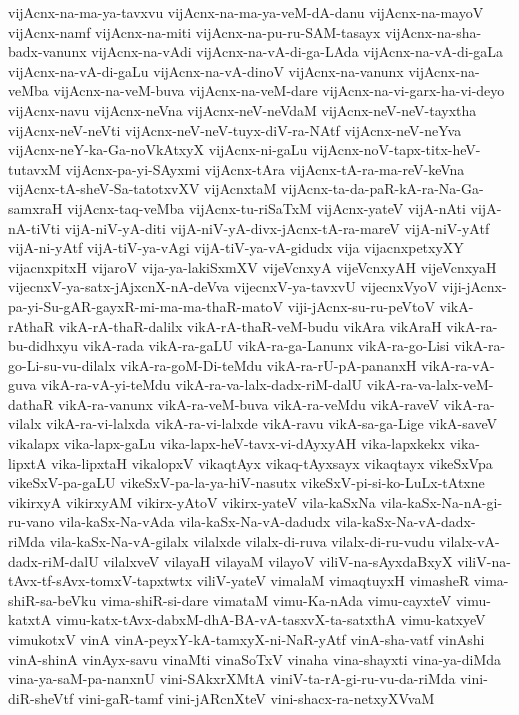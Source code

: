 {vijAcnx-na-ma-ya-tavxvu
vijAcnx-na-ma-ya-veM-dA-danu
vijAcnx-na-mayoV
vijAcnx-namf
vijAcnx-na-miti
vijAcnx-na-pu-ru-SAM-tasayx
vijAcnx-na-sha-badx-vanunx
vijAcnx-na-vAdi
vijAcnx-na-vA-di-ga-LAda
vijAcnx-na-vA-di-gaLa
vijAcnx-na-vA-di-gaLu
vijAcnx-na-vA-dinoV
vijAcnx-na-vanunx
vijAcnx-na-veMba
vijAcnx-na-veM-buva
vijAcnx-na-veM-dare
vijAcnx-na-vi-garx-ha-vi-deyo
vijAcnx-navu
vijAcnx-neVna
vijAcnx-neV-neVdaM
vijAcnx-neV-neV-tayxtha
vijAcnx-neV-neVti
vijAcnx-neV-neV-tuyx-diV-ra-NAtf
vijAcnx-neV-neYva
vijAcnx-neY-ka-Ga-noVkAtxyX
vijAcnx-ni-gaLu
vijAcnx-noV-tapx-titx-heV-tutavxM
vijAcnx-pa-yi-SAyxmi
vijAcnx-tAra
vijAcnx-tA-ra-ma-reV-keVna
vijAcnx-tA-sheV-Sa-tatotxvXV
vijAcnxtaM
vijAcnx-ta-da-paR-kA-ra-Na-Ga-samxraH
vijAcnx-taq-veMba
vijAcnx-tu-riSaTxM
vijAcnx-yateV
vijA-nAti
vijA-nA-tiVti
vijA-niV-yA-diti
vijA-niV-yA-divx-jAcnx-tA-ra-mareV
vijA-niV-yAtf
vijA-ni-yAtf
vijA-tiV-ya-vAgi
vijA-tiV-ya-vA-gidudx
vija
vijacnxpetxyXY
vijacnxpitxH
vijaroV
vija-ya-lakiSxmXV
vijeVcnxyA
vijeVcnxyAH
vijeVcnxyaH
vijecnxV-ya-satx-jAjxcnX-nA-deVva
vijecnxV-ya-tavxvU
vijecnxVyoV
viji-jAcnx-pa-yi-Su-gAR-gayxR-mi-ma-ma-thaR-matoV
viji-jAcnx-su-ru-peVtoV
vikA-rAthaR
vikA-rA-thaR-dalilx
vikA-rA-thaR-veM-budu
vikAra
vikAraH
vikA-ra-bu-didhxyu
vikA-rada
vikA-ra-gaLU
vikA-ra-ga-Lanunx
vikA-ra-go-Lisi
vikA-ra-go-Li-su-vu-dilalx
vikA-ra-goM-Di-teMdu
vikA-ra-rU-pA-pananxH
vikA-ra-vA-guva
vikA-ra-vA-yi-teMdu
vikA-ra-va-lalx-dadx-riM-dalU
vikA-ra-va-lalx-veM-dathaR
vikA-ra-vanunx
vikA-ra-veM-buva
vikA-ra-veMdu
vikA-raveV
vikA-ra-vilalx
vikA-ra-vi-lalxda
vikA-ra-vi-lalxde
vikA-ravu
vikA-sa-ga-Lige
vikA-saveV
vikalapx
vika-lapx-gaLu
vika-lapx-heV-tavx-vi-dAyxyAH
vika-lapxkekx
vika-lipxtA
vika-lipxtaH
vikalopxV
vikaqtAyx
vikaq-tAyxsayx
vikaqtayx
vikeSxVpa
vikeSxV-pa-gaLU
vikeSxV-pa-la-ya-hiV-nasutx
vikeSxV-pi-si-ko-LuLx-tAtxne
vikirxyA
vikirxyAM
vikirx-yAtoV
vikirx-yateV
vila-kaSxNa
vila-kaSx-Na-nA-gi-ru-vano
vila-kaSx-Na-vAda
vila-kaSx-Na-vA-dadudx
vila-kaSx-Na-vA-dadx-riMda
vila-kaSx-Na-vA-gilalx
vilalxde
vilalx-di-ruva
vilalx-di-ru-vudu
vilalx-vA-dadx-riM-dalU
vilalxveV
vilayaH
vilayaM
vilayoV
viliV-na-sAyxdaBxyX
viliV-na-tAvx-tf-sAvx-tomxV-tapxtwtx
viliV-yateV
vimalaM
vimaqtuyxH
vimasheR
vima-shiR-sa-beVku
vima-shiR-si-dare
vimataM
vimu-Ka-nAda
vimu-cayxteV
vimu-katxtA
vimu-katx-tAvx-dabxM-dhA-BA-vA-tasxvX-ta-satxthA
vimu-katxyeV
vimukotxV
vinA
vinA-peyxY-kA-tamxyX-ni-NaR-yAtf
vinA-sha-vatf
vinAshi
vinA-shinA
vinAyx-savu
vinaMti
vinaSoTxV
vinaha
vina-shayxti
vina-ya-diMda
vina-ya-saM-pa-nanxnU
vini-SAkxrXMtA
viniV-ta-rA-gi-ru-vu-da-riMda
vini-diR-sheVtf
vini-gaR-tamf
vini-jARcnXteV
vini-shacx-ra-netxyXVvaM
}
